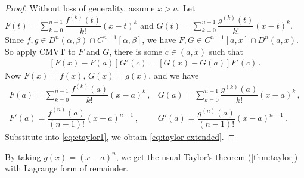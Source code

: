 \documentclass{article}
\begin{document}
\begin{proof}
    Without loss of generality, assume $ x > a $. Let $ \displaystyle F(t) = \sum_{k=0}^{n-1} \dfrac{f^{(k)} (t)}{k!} (x - t)^{k} $ and $ \displaystyle G(t) = \sum_{k=0}^{n-1} \dfrac{g^{(k)} (t)}{k!} (x - t)^{k} $. Since $ f, g \in D^{n} (\alpha, \beta) \cap C^{n - 1} [\alpha, \beta] $, we have $ F, G \in C^{n - 1} [a, x] \cap D^{n} (a, x) $. So apply CMVT to $ F $ and $ G $, there is some $ c \in (a, x) $ such that
    \begin{align} \label{eq:etaylor1}
        [F(x) - F(a)] G'(c) = [G(x) - G(a)] F'(c) \,. 
    \end{align}
    Now $ F(x) = f(x) $, $ G(x) = g(x) $, and we have
    \[ 
        \begin{array}{ll} \displaystyle
            F(a) = \sum_{k = 0}^{n-1} \dfrac{f^{(k)} (a)}{k!} (x - a)^k \,, &
            G(a) = \sum_{k = 0}^{n-1} \dfrac{g^{(k)} (a)}{k!} (x - a)^k \,,  \\[1.5em]
            F'(a) = \dfrac{f^{(n)}(a)}{(n - 1)!} (x - a)^{n - 1} \,,       &
            G'(a) = \dfrac{g^{(n)}(a)}{(n - 1)!} (x - a)^{n - 1} \,.
        \end{array}
    \]
    Substitute into \eqref{eq:etaylor1}, we obtain \eqref{eq:taylor-extended}.
\end{proof}

By taking $ g(x) = (x - a)^n $, we get the usual Taylor's theorem (\ref{thm:taylor}) with Lagrange form of remainder.
\end{document}
